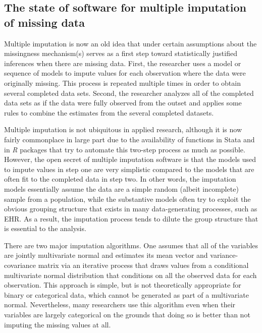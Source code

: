 \documentclass[11pt,notitlepage]{article}
\begin{document}
\subsection*{The state of software for multiple imputation of missing data}

Multiple imputation is now an old idea that under certain assumptions about the missingness 
mechanism(s) serves as a first step toward statistically justified inferences when there
are missing data. First, the researcher uses a model or sequence of models to impute values for 
each observation where the data were originally missing. This process is repeated multiple times
in order to obtain several completed data sets. Second, the researcher analyzes all of the 
completed data sets as if the data were fully observed from the outset and applies some rules to
combine the estimates from the several completed datasets.

Multiple imputation is not ubiquitous in applied research, although it is now fairly commonplace
in large part due to the availability of functions in Stata and in \textit{R} packages that try
to automate this two-step process as much as possible. However, the open secret of multiple
imputation software is that the models used to impute values in step one are very simplistic
compared to the models that are often fit to the completed data in step two. In other words,
the imputation models essentially assume the data are a simple random (albeit incomplete)
sample from a population, while the substantive models often try to exploit the obvious
grouping structure that exists in many data-generating processes, such as EHR. As a result,
the imputation process tends to dilute the group structure that is essential to the analysis.

There are two major imputation algorithms. One assumes that all of the variables are jointly
multivariate normal and estimates its mean vector and variance-covariance matrix via an
iterative process that draws values from a conditional multivariate normal distribution that
conditions on all the observed data for each observation. This approach is simple, but is 
not theoretically appropriate for binary or categorical data, which cannot be generated as
part of a multivariate normal. Nevertheless, many researchers use this algorithm even when
their variables are largely categorical on the grounds that doing so is better than not
imputing the missing values at all.
\end{document}
